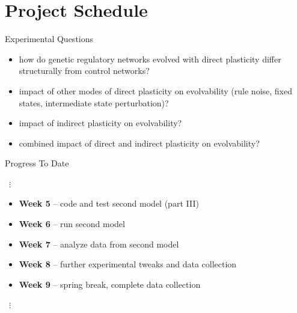 \section{Project Schedule}

\begin{frame}{Experimental Questions}
\begin{itemize}
\item how do genetic regulatory networks evolved with direct plasticity differ structurally from control networks? \cite{Reisinger2007AcquiringRepresentations}
\item impact of other modes of direct plasticity on evolvability (rule noise, fixed states, intermediate state perturbation)?
\item impact of indirect plasticity on evolvability?   
\item combined impact of direct and indirect plasticity on evolvability?   
\end{itemize}
\end{frame}

\begin{frame}{Progress To Date}
\begin{center}
{\centering ~$\bm{\vdots}$~}
\end{center}
\begin{itemize}
  \item \textbf{Week 5} -- code and test second model (part III) \checkmark
  \item \textbf{Week 6} -- run second model \checkmark
  \item \textbf{Week 7} -- analyze data from second model \checkmark
  \item \textbf{Week 8} -- further experimental tweaks and data collection \checkmark
  \item \textbf{Week 9} -- spring break, complete data collection 
\end{itemize}
\vspace{-1ex}
\begin{center}
{\centering ~$\bm{\vdots}$~}
\end{center}
\end{frame}

